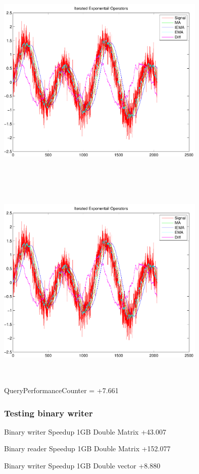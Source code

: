 \documentclass[9pt]{article}
\theoremstyle{plain}
\theoremstyle{definition}
\theoremstyle{remark}
\numberwithin{equation}{section}
\begin{document}
\includegraphics[width=10.0cm,height=10.0cm]{IteratedExponentailOperators.pdf}

\includegraphics[width=10.0cm,height=10.0cm]{IteratedExponentailOperators.pdf}

QueryPerformanceCounter  =  +7.661
\subsubsection{Testing binary writer}
Binary writer Speedup 1GB Double Matrix +43.007

Binary reader Speedup 1GB Double Matrix +152.077

Binary writer Speedup 1GB Double vector +8.880
\end{document}
